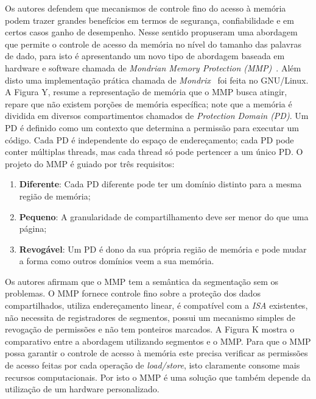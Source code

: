 
Os autores defendem que mecanismos de controle fino do acesso à memória podem
trazer grandes benefícios em termos de segurança, confiabilidade e em certos
casos ganho de desempenho. Nesse sentido \cite{mmp} propuseram uma abordagem
que permite o controle de acesso da memória no nível do tamanho das palavras de
dado, para isto é apresentando um novo tipo de abordagem baseada em hardware e
software chamada de \emph{Mondrian Memory Protection (MMP)}~\citep{mmp}. Além
disto uma implementação prática chamada de \emph{Mondrix}~\cite{mondrix} foi
feita no GNU/Linux. A Figura Y, resume a representação de memória que o MMP
busca atingir, repare que não existem porções de memória específica; note que a
memória é dividida em diversos compartimentos chamados de \emph{Protection
Domain (PD)}. Um PD é definido como um contexto que determina a permissão para
executar um código. Cada PD é independente do espaço de endereçamento; cada PD
pode conter múltiplas threads, mas cada thread só pode pertencer a um único PD.
O projeto do MMP é guiado por três requisitos:

\begin{enumerate}
	\item \textbf{Diferente}: Cada PD diferente pode ter um domínio distinto
				para a mesma região de memória;
	\item \textbf{Pequeno}: A granularidade de compartilhamento deve ser menor
				do que uma página;
	\item \textbf{Revogável}: Um PD é dono da sua própria região de memória e
				pode mudar a forma como outros domínios veem a sua memória.
\end{enumerate}

Os autores afirmam que o MMP tem a semântica da segmentação sem os problemas. O
MMP fornece controle fino sobre a proteção dos dados compartilhados, utiliza
endereçamento linear, é compatível com a \emph{ISA} existentes, não necessita de
registradores de segmentos, possui um mecanismo simples de revogação de
permissões e não tem ponteiros marcados. A Figura K mostra o comparativo entre
a abordagem utilizando segmentos e o MMP. Para que o MMP possa garantir o
controle de acesso à memória este precisa verificar as permissões de acesso
feitas por cada operação de \emph{load/store}, isto claramente consome mais
recursos computacionais. Por isto o MMP é uma solução que também depende da
utilização de um hardware personalizado.


